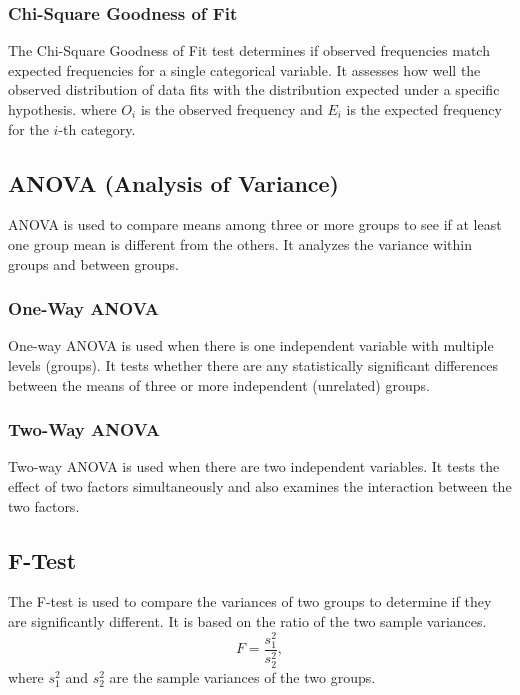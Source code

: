 \subsubsection{Chi-Square Goodness of Fit}
The Chi-Square Goodness of Fit test determines if observed frequencies match expected frequencies for a single categorical variable. It assesses how well the observed distribution of data fits with the distribution expected under a specific hypothesis.
where $O_i$ is the observed frequency and $E_i$ is the expected frequency for the $i$-th category.

\subsection{ANOVA (Analysis of Variance)}
ANOVA is used to compare means among three or more groups to see if at least one group mean is different from the others. It analyzes the variance within groups and between groups.

\subsubsection{One-Way ANOVA}
One-way ANOVA is used when there is one independent variable with multiple levels (groups). It tests whether there are any statistically significant differences between the means of three or more independent (unrelated) groups.

\subsubsection{Two-Way ANOVA}
Two-way ANOVA is used when there are two independent variables. It tests the effect of two factors simultaneously and also examines the interaction between the two factors.

\subsection{F-Test}
The F-test is used to compare the variances of two groups to determine if they are significantly different. It is based on the ratio of the two sample variances.
\begin{equation}
F = \frac{s_1^2}{s_2^2},
\end{equation}
where $s_1^2$ and $s_2^2$ are the sample variances of the two groups.

